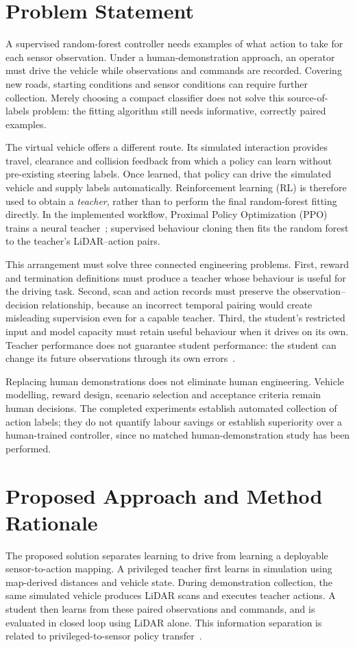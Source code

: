 \section{Problem Statement}
A supervised random-forest controller needs examples of what action to take
for each sensor observation. Under a human-demonstration approach, an operator
must drive the vehicle while observations and commands are recorded. Covering
new roads, starting conditions and sensor conditions can require further
collection. Merely choosing a compact classifier does not solve this source-of-labels
problem: the fitting algorithm still needs informative, correctly paired examples.

The virtual vehicle offers a different route. Its simulated interaction provides
travel, clearance and collision feedback from which a policy can learn without
pre-existing steering labels. Once learned, that policy can drive the simulated
vehicle and supply labels automatically. Reinforcement learning (RL) is therefore
used to obtain a \emph{teacher}, rather than to perform the final random-forest
fitting directly. In the implemented workflow, Proximal Policy Optimization
(PPO) trains a neural teacher~\cite{schulman2017ppo}; supervised behaviour cloning
then fits the random forest to the teacher's LiDAR--action pairs.

This arrangement must solve three connected engineering problems. First, reward
and termination definitions must produce a teacher whose behaviour is useful
for the driving task. Second, scan and action records must preserve the
observation--decision relationship, because an incorrect temporal pairing would
create misleading supervision even for a capable teacher. Third, the student's
restricted input and model capacity must retain useful behaviour when it drives
on its own. Teacher performance does not guarantee student performance: the
student can change its future observations through its own errors~\cite{ross2011reduction}.

Replacing human demonstrations does not eliminate human engineering. Vehicle
modelling, reward design, scenario selection and acceptance criteria remain
human decisions. The completed experiments establish automated collection of
action labels; they do not quantify labour savings or establish superiority over
a human-trained controller, since no matched human-demonstration study has been
performed.

\section{Proposed Approach and Method Rationale}
The proposed solution separates learning to drive from learning a deployable
sensor-to-action mapping. A privileged teacher first learns in simulation using
map-derived distances and vehicle state. During demonstration collection, the
same simulated vehicle produces LiDAR scans and executes teacher actions. A
student then learns from these paired observations and commands, and is evaluated
in closed loop using LiDAR alone. This information separation is related to
privileged-to-sensor policy transfer~\cite{chen2019cheating}.


